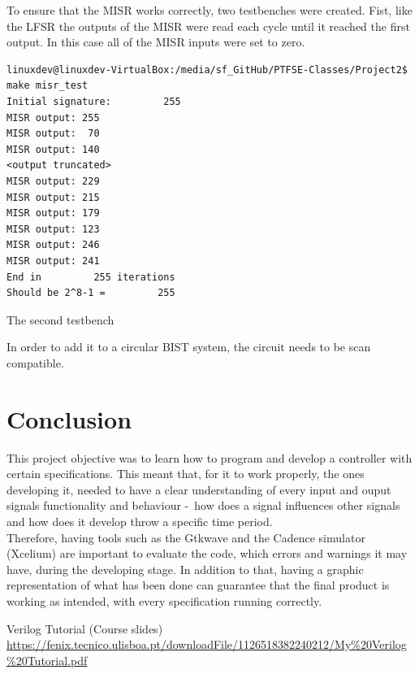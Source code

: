 \documentclass[12pt]{article}
\begin{document}
To ensure that the MISR works correctly, two testbenches were created. Fist, like the LFSR the outputs of the MISR were read each cycle until it reached the first output. In this case all of the MISR inputs were set to zero. 
    
    \begin{lstlisting}[caption={Counter variables.},captionpos=b]
linuxdev@linuxdev-VirtualBox:/media/sf_GitHub/PTFSE-Classes/Project2$ make misr_test
Initial signature:         255
MISR output: 255
MISR output:  70
MISR output: 140
<output truncated>
MISR output: 229
MISR output: 215
MISR output: 179
MISR output: 123
MISR output: 246
MISR output: 241
End in         255 iterations
Should be 2^8-1 =         255
    \end{lstlisting}    
    
The second testbench   
    
    
    
    
    
	In order to add it to a circular BIST system, the circuit needs to be scan compatible.
    
    
    
 \newpage   
	
	\section{Conclusion}
	This project objective was to learn how to program and develop a controller with certain \mbox{specifications}. This meant that, for it to work properly, the ones developing it, needed to have a clear understanding of every input and ouput signals functionality and behaviour \mbox{- how} does a signal influences other signals and how does it develop throw a specific time period.\\ 
	Therefore, having tools such as the Gtkwave and the Cadence simulator (Xcelium) are important to evaluate the code, which errors and warnings it may have, during the developing stage. In addition to that, having a graphic representation of what has been done can guarantee that the final product is working as intended, with every specification running correctly.

	\begin{thebibliography}{20}
Verilog Tutorial (Course slides)\\
\url{https://fenix.tecnico.ulisboa.pt/downloadFile/1126518382240212/My%20Verilog%20Tutorial.pdf}

\end{thebibliography}
\end{document}
